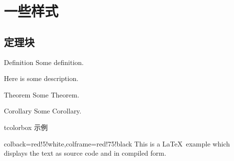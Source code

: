 
\section{一些样式}


\subsection{定理块}

\begin{frame}
    \begin{defn}{Definition}{}
    Some definition\supercite{WHU-Beamer}.
    \end{defn}
    Here is some description.
    \begin{theo}{Theorem}{}
    Some Theorem.
    \end{theo}
    \begin{coro}{Corollary}{}
        Some Corollary.
    \end{coro}
    
\end{frame}


\begin{frame}
    
\end{frame}


\begin{frame}[fragile]{tcolorbox 示例}
    \begin{tcblisting}{colback=red!5!white,colframe=red!75!black}
        This is a \LaTeX\ example which displays the text as source code
        and in compiled form.
    \end{tcblisting}
\end{frame}

